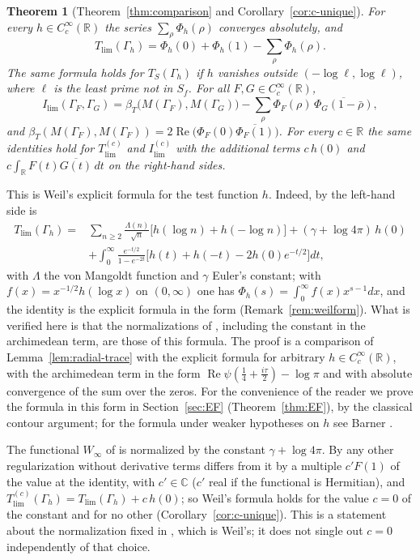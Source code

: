 \documentclass[11pt]{amsart}
\newtheorem{theorem}{Theorem}[section]
\theoremstyle{remark}
\numberwithin{equation}{section}
\newcommand{\C}{\mathbb C}
\newcommand{\R}{\mathbb R}
\newcommand{\Rel}{\operatorname{Re}}
\newcommand{\Tl}{T_{\lim}}
\newcommand{\Il}{I_{\lim}}
\begin{document}
\begin{theorem}[Theorem~\ref{thm:comparison} and
Corollary~\ref{cor:c-unique}]
\label{thm:introA}
For every $h\in C_c^\infty(\R)$ the series $\sum_\rho\Phi_h(\rho)$ converges
absolutely, and
\[
  \Tl(\Gamma_h)=\Phi_h(0)+\Phi_h(1)-\sum_\rho\Phi_h(\rho).
\]
The same formula holds for $T_S(\Gamma_h)$ if $h$ vanishes outside
$(-\log\ell,\log\ell)$, where $\ell$ is the least prime not in $S_f$.  For
all $F,G\in C_c^\infty(\R)$,
\[
  \Il(\Gamma_F,\Gamma_G)
  =\beta_T\bigl(M(\Gamma_F),M(\Gamma_G)\bigr)
   -\sum_\rho\Phi_F(\rho)\,\overline{\Phi_G(1-\bar\rho)} ,
\]
and $\beta_T(M(\Gamma_F),M(\Gamma_F))
=2\Rel\bigl(\Phi_F(0)\overline{\Phi_F(1)}\bigr)$.  For every $c\in\R$ the
same identities hold for $T^{(c)}_{\lim}$ and $I^{(c)}_{\lim}$ with the
additional terms $c\,h(0)$ and $c\int_\R F(t)\overline{G(t)}\,dt$ on the
right-hand sides.
\end{theorem}

This is Weil's explicit formula \cite{Weil1952} for the test function $h$.
Indeed, by \cite[Lemma~A.1]{P43} the left-hand side is
\[
\begin{aligned}
  \Tl(\Gamma_h)={}&\sum_{n\ge2}\frac{\Lambda(n)}{\sqrt n}
     \bigl[h(\log n)+h(-\log n)\bigr]
  +(\gamma+\log4\pi)\,h(0)\\
  &+\int_0^\infty\frac{e^{-t/2}}{1-e^{-2t}}
     \bigl[h(t)+h(-t)-2h(0)e^{-t/2}\bigr]dt ,
\end{aligned}
\]
with $\Lambda$ the von Mangoldt function and $\gamma$ Euler's constant; with
$f(x)=x^{-1/2}h(\log x)$ on $(0,\infty)$ one has
$\Phi_h(s)=\int_0^\infty f(x)x^{s-1}dx$, and the identity is the explicit
formula in the form \cite[(1)]{CCWeilArch} (Remark~\ref{rem:weilform}).
What is verified here is that the normalizations of \cite{P43}, including
the constant in the archimedean term, are those of this formula.  The proof
is a comparison of Lemma~\ref{lem:radial-trace} with the explicit formula
for arbitrary $h\in C_c^\infty(\R)$, with the archimedean term in the form
$\Rel\psi(\frac14+\frac{i\tau}2)-\log\pi$ and with absolute convergence of
the sum over the zeros.  For the convenience of the reader we prove the
formula in this form in Section~\ref{sec:EF} (Theorem~\ref{thm:EF}), by the
classical contour argument; for the formula under weaker hypotheses on $h$
see Barner \cite{Barner1981}.

The functional $W_\infty$ of \cite[Definition~5.4]{P43} is normalized by the
constant $\gamma+\log4\pi$.  By \cite[Theorem~5.7]{P43} any other
regularization without derivative terms differs from it by a multiple
$c'F(1)$ of the value at the identity, with $c'\in\C$ ($c'$ real if the
functional is Hermitian), and
$T^{(c)}_{\lim}(\Gamma_h)=\Tl(\Gamma_h)+c\,h(0)$; so Weil's formula holds
for the value $c=0$ of the constant and for no other
(Corollary~\ref{cor:c-unique}).  This is a statement about the
normalization fixed in \cite{P43}, which is Weil's; it does not single out
$c=0$ independently of that choice.
\end{document}

